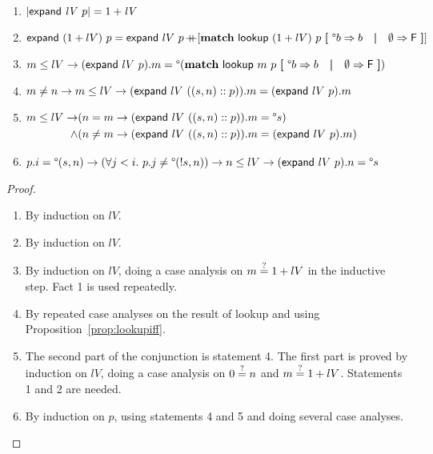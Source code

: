 \documentclass[a4paper,UKenglish,cleveref, autoref]{lipics-v2019}
\begin{document}
\begin{lemma}\label{prop:expandtech}\leavevmode
  \begin{enumerate}
    \item $|\normalfont\textsf{expand}~\mathit{lV}~p| = 1 +{\mathit{lV}}$
    \item $\normalfont\textsf{expand}~(1 +{lV})~p = \normalfont\textsf{expand}~lV~p \mathop{{+}\!\!\!{+}} [\textbf{match}~ \normalfont\textsf{lookup}~(1 +{lV})~p ~\textbf{[}~ \degree b \Rightarrow b \quad\textbf{|}\quad \emptyset \Rightarrow \mathsf{F} ~\textbf{]}]$
    \item $m \le lV \rightarrow (\normalfont\textsf{expand}~lV~p).m = \degree(\textbf{match}~ \normalfont\textsf{lookup}~m~p ~\textbf{[}~ \degree b \Rightarrow b \quad\textbf{|}\quad \emptyset \Rightarrow \mathsf{F} ~\textbf{]})$
    \item $m \neq n \rightarrow m \le lV \rightarrow (\normalfont\textsf{expand}~lV~((s, n) :: p)).m = (\normalfont\textsf{expand}~lV~p).m$
    \item $\begin{aligned}[t]
        m \le lV \rightarrow & (n = m \rightarrow (\normalfont\textsf{expand}~lV~((s, n) :: p)).m = \degree s) \\
      \land & (n \neq m \rightarrow (\normalfont\textsf{expand}~lV~((s, n) :: p)).m = (\normalfont\textsf{expand}~lV~p).m)
    \end{aligned}
    $
  \item $p.i = \degree(s, n) \rightarrow (\forall j < i.~p.j \neq \degree(!{s}, n)) \rightarrow n \le lV \rightarrow (\normalfont\textsf{expand}~lV~p).n = \degree s$
  \end{enumerate}
\end{lemma}
\begin{proof}
  \begin{enumerate}
    \item By induction on $lV$.
    \item By induction on $lV$.
    \item By induction on $lV$, doing a case analysis on $m\overset{?}{=}1 +{lV}$ in the inductive step. Fact 1 is used repeatedly.
    \item By repeated case analyses on the result of \textsf{lookup} and using Proposition~\ref{prop:lookupiff}.
    \item The second part of the conjunction is statement 4. The first part is proved by induction on $lV$, doing a case analysis on $0\overset{?}{=}n$ and $m\overset{?}{=}1 +{lV}$. Statements 1 and 2 are needed. 
    \item By induction on $p$, using statements 4 and 5 and doing several case analyses.
  \end{enumerate}
\end{proof}
\end{document}
